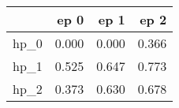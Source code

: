 \begin{tabular}{lrrr}
\toprule
{} &   ep 0 &   ep 1 &   ep 2 \\
\midrule
hp\_0 &  0.000 &  0.000 &  0.366 \\
hp\_1 &  0.525 &  0.647 &  0.773 \\
hp\_2 &  0.373 &  0.630 &  0.678 \\
\bottomrule
\end{tabular}
